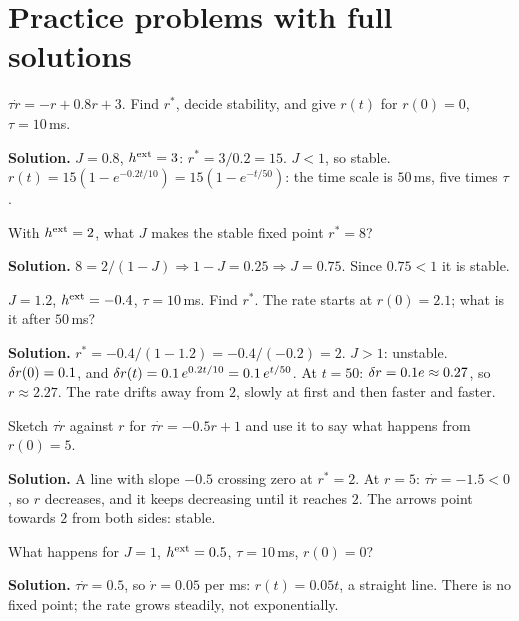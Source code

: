 \section{Practice problems with full solutions}

\begin{example}
$\tau\dot r = -r + 0.8r + 3$. Find $r^*$, decide stability, and give $r(t)$ for $r(0)=0$, $\tau=10$\,ms.

\textbf{Solution.} $J=0.8$, $h^{\text{ext}}=3$: $r^* = 3/0.2 = 15$. $J<1$, so stable. $r(t) = 15(1-e^{-0.2t/10}) = 15(1-e^{-t/50})$: the time scale is $50$\,ms, five times $\tau$.
\end{example}

\begin{example}
With $h^{\text{ext}}=2$, what $J$ makes the stable fixed point $r^*=8$?

\textbf{Solution.} $8 = 2/(1-J)\Rightarrow 1-J = 0.25\Rightarrow J=0.75$. Since $0.75<1$ it is stable. \checkmark
\end{example}

\begin{example}
$J=1.2$, $h^{\text{ext}}=-0.4$, $\tau=10$\,ms. Find $r^*$. The rate starts at $r(0)=2.1$; what is it after $50$\,ms?

\textbf{Solution.} $r^* = -0.4/(1-1.2) = -0.4/(-0.2) = 2$. $J>1$: unstable. $\delta r(0)=0.1$, and $\delta r(t) = 0.1\,e^{0.2t/10} = 0.1\,e^{t/50}$.
At $t=50$: $\delta r = 0.1e\approx0.27$, so $r\approx2.27$. The rate drifts away from $2$, slowly at first and then faster and faster.
\end{example}

\begin{example}
Sketch $\tau\dot r$ against $r$ for $\tau\dot r = -0.5r + 1$ and use it to say what happens from $r(0)=5$.

\textbf{Solution.} A line with slope $-0.5$ crossing zero at $r^*=2$. At $r=5$: $\tau\dot r = -1.5<0$, so $r$ decreases, and it keeps decreasing until it reaches $2$.
The arrows point towards $2$ from both sides: stable.
\end{example}

\begin{example}
What happens for $J=1$, $h^{\text{ext}}=0.5$, $\tau=10$\,ms, $r(0)=0$?

\textbf{Solution.} $\tau\dot r = 0.5$, so $\dot r = 0.05$ per ms: $r(t)=0.05t$, a straight line. There is no fixed point; the rate grows steadily, not exponentially.
\end{example}

